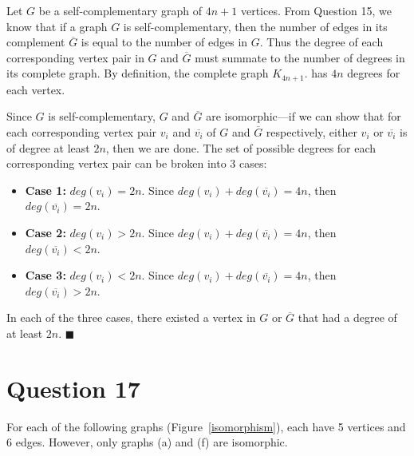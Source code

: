 \documentclass[11pt, oneside]{article}   	%
\newcommand*{\QEDA}{\hfill\ensuremath{\blacksquare}}         %
\begin{document}
{{{{%
Let $G$ be a self-complementary graph of $4n+1$ vertices.
From Question 15, we know that if a graph $G$ is self-complementary, then the number of edges in its complement $\overline{G}$ is equal to the number of edges in $G$. Thus the degree of each corresponding vertex pair in $G$ and $\overline{G}$ must summate to the number of degrees in its complete graph. By definition, the complete graph $K_{4n+1}$.
has $4n$ degrees for each vertex.

Since $G$ is self-complementary, $G$ and $\overline{G}$ are isomorphic---if we can show that for each corresponding vertex pair $v_i$ and $\overline{v_i}$ of $G$ and $\overline{G}$ respectively, either $v_i$ or $\overline{v_i}$ is of degree at least $2n$, then we are done. The set of possible degrees for each corresponding vertex pair can be broken into 3 cases:

\begin{itemize}
\item \textbf{Case 1:} $deg(v_i) = 2n$. Since $deg(v_i) + deg(\overline{v_i}) = 4n$, then $deg(\overline{v_i}) = 2n$.
\item \textbf{Case 2:} $deg(v_i) > 2n$. Since $deg(v_i) + deg(\overline{v_i}) = 4n$, then $deg(\overline{v_i}) < 2n$.
\item \textbf{Case 3:} $deg(v_i) < 2n$. Since $deg(v_i) + deg(\overline{v_i}) = 4n$, then $deg(\overline{v_i}) > 2n$.
\end{itemize}

%
%
%
%
%

In each of the three cases, there existed a vertex in $G$ or $\overline{G}$ that had a degree of at least $2n$. \QEDA

\section*{Question 17}
For each of the following graphs (Figure~\ref{isomorphism}), each have 5 vertices and 6 edges. However, only graphs (a) and (f) are isomorphic.

}}}}
\end{document}
